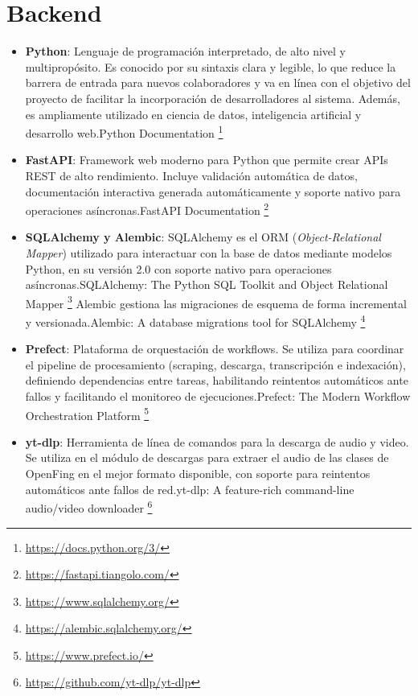 \section{Backend}
\label{section:5-backend}
\begin{itemize}
    \item \textbf{Python}: Lenguaje de programación interpretado, de alto nivel y multipropósito. Es conocido por su sintaxis clara y legible, lo que reduce la barrera de entrada para nuevos colaboradores y va en línea con el objetivo del proyecto de facilitar la incorporación de desarrolladores al sistema. Además, es ampliamente utilizado en ciencia de datos, inteligencia artificial y desarrollo web.Python Documentation \footnote{\url{https://docs.python.org/3/}}

    \item \textbf{FastAPI}: Framework web moderno para Python que permite crear APIs REST de alto rendimiento. Incluye validación automática de datos, documentación interactiva generada automáticamente y soporte nativo para operaciones asíncronas.FastAPI Documentation \footnote{\url{https://fastapi.tiangolo.com/}}

    \item \textbf{SQLAlchemy y Alembic}: SQLAlchemy es el ORM (\textit{Object-Relational Mapper}) utilizado para interactuar con la base de datos mediante modelos Python, en su versión 2.0 con soporte nativo para operaciones asíncronas.SQLAlchemy: The Python SQL Toolkit and Object Relational Mapper \footnote{\url{https://www.sqlalchemy.org/}} Alembic gestiona las migraciones de esquema de forma incremental y versionada.Alembic: A database migrations tool for SQLAlchemy \footnote{\url{https://alembic.sqlalchemy.org/}}

    \item \textbf{Prefect}: Plataforma de orquestación de workflows. Se utiliza para coordinar el pipeline de procesamiento (scraping, descarga, transcripción e indexación), definiendo dependencias entre tareas, habilitando reintentos automáticos ante fallos y facilitando el monitoreo de ejecuciones.Prefect: The Modern Workflow Orchestration Platform \footnote{\url{https://www.prefect.io/}}

    \item \textbf{yt-dlp}: Herramienta de línea de comandos para la descarga de audio y video. Se utiliza en el módulo de descargas para extraer el audio de las clases de OpenFing en el mejor formato disponible, con soporte para reintentos automáticos ante fallos de red.yt-dlp: A feature-rich command-line audio/video downloader \footnote{\url{https://github.com/yt-dlp/yt-dlp}}


\end{itemize}
